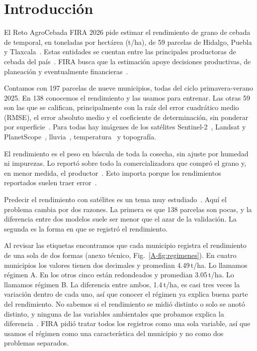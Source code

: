\section{Introducción}\label{sec:intro}

El Reto AgroCebada FIRA 2026 pide estimar el rendimiento de grano de cebada de temporal, en toneladas por hectárea
(t/ha), de 59 parcelas de Hidalgo, Puebla y Tlaxcala~\cite{bases}. Estas entidades se cuentan entre las principales
productoras de cebada del país~\cite{sader2025}. FIRA busca que la estimación apoye decisiones productivas, de planeación
y eventualmente financieras~\cite{preguntas}.

Contamos con 197 parcelas de nueve municipios, todas del ciclo primavera-verano 2025. En 138 conocemos el rendimiento y
las usamos para entrenar. Las otras 59 son las que se califican, principalmente con la raíz del error cuadrático medio (RMSE), el error absoluto medio y el coeficiente de
determinación, sin ponderar por superficie~\cite{preguntas}. Para todas hay imágenes de los satélites
Sentinel-2~\cite{drusch2012}, Landsat y PlanetScope~\cite{frazier2021}, lluvia~\cite{funk2015},
temperatura~\cite{chirts} y topografía.

El rendimiento es el peso en báscula de toda la cosecha, sin ajuste por humedad ni impurezas. Lo reportó sobre todo la
comercializadora que compró el grano y, en menor medida, el productor~\cite{preguntas}. Esto importa porque los
rendimientos reportados suelen traer error~\cite{lobell2020}.

Predecir el rendimiento con satélites es un tema muy estudiado~\cite{vanklompenburg2020,weiss2020}. Aquí el problema
cambia por dos razones. La primera es que 138 parcelas son pocas, y la diferencia entre dos modelos suele ser menor que
el azar de la validación. La segunda es la forma en que se registró el rendimiento.

Al revisar las etiquetas encontramos que cada municipio registra el rendimiento de una sola de dos formas (anexo
técnico, Fig.~\ref{A-fig:regimenes}). En cuatro municipios los valores tienen dos decimales y promedian 4.49\,t/ha. Lo
llamamos régimen A. En los otros cinco están redondeados y promedian 3.05\,t/ha. Lo llamamos régimen B. La diferencia entre ambos, 1.4\,t/ha, es casi tres veces la variación dentro de cada uno,
así que conocer el régimen ya explica buena parte del rendimiento. No sabemos si
el rendimiento se midió distinto o solo se anotó distinto, y ninguna de las variables ambientales que probamos explica la diferencia~\cite{doc_regimenes}. FIRA pidió tratar todos los registros como una sola variable,
así que usamos el régimen como una característica del municipio y no como dos problemas separados.

